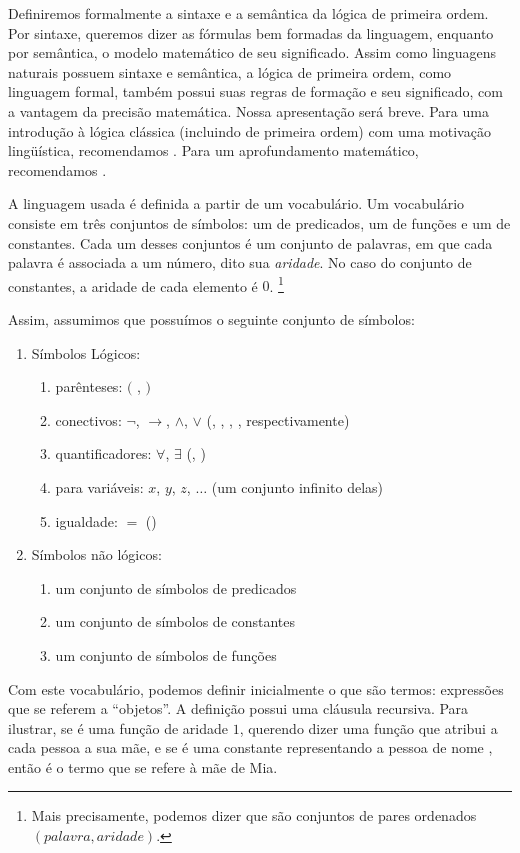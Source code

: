Definiremos formalmente a sintaxe e a semântica da lógica de primeira ordem. Por sintaxe, queremos dizer as fórmulas bem formadas da linguagem, enquanto por semântica, o modelo matemático de seu significado. Assim como linguagens naturais possuem sintaxe e semântica, a lógica de primeira ordem, como linguagem formal, também possui suas regras de formação e seu significado, com a vantagem da precisão matemática. Nossa apresentação será breve. Para uma introdução à lógica clássica (incluindo de primeira ordem) com uma motivação lingüística, recomendamos \citet{gamut1}.  Para um aprofundamento matemático, recomendamos \citet{enderton}. \fixd

A linguagem usada é definida a partir de um vocabulário. Um vocabulário consiste em três conjuntos de símbolos: um de predicados, um de funções e um de constantes. Cada um desses conjuntos é um conjunto de palavras, em que cada palavra é associada a um número, dito sua \textit{aridade}. No caso do conjunto de constantes, a aridade de cada elemento é $0$. \footnote{Mais precisamente, podemos dizer que são conjuntos de pares ordenados $(palavra,aridade)$.}

Assim, assumimos que possuímos o seguinte conjunto de símbolos:
\begin{enumerate}
\item 	Símbolos Lógicos:
		\begin{enumerate}
		\item parênteses: $($ , $)$
		\item conectivos: $\neg$, $\rightarrow$, $\land$, $\lor$ (, , , , respectivamente)
		\item quantificadores: $\forall$, $\exists$ (, )
		\item para variáveis: $x$, $y$, $z$, $\dots$ (um conjunto infinito delas)
		\item igualdade: $=$ ()
		\end{enumerate}
\item	Símbolos não lógicos:
		\begin{enumerate}
		\item um conjunto de símbolos de predicados
		\item um conjunto de símbolos de constantes
		\item um conjunto de símbolos de funções
		\end{enumerate}
\end{enumerate}

Com este vocabulário, podemos definir inicialmente o que são termos: expressões que se referem a ``objetos''. A definição possui uma cláusula recursiva. Para ilustrar, se  é uma função de aridade $1$, querendo dizer uma função que atribui a cada pessoa a sua mãe, e se  é uma constante representando a pessoa de nome , então  é o termo que se refere à mãe de Mia.

